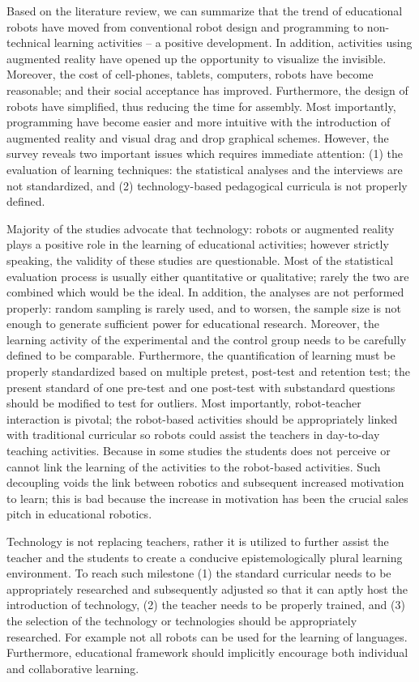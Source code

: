 \documentclass[conference]{IEEEtran}
\begin{document}
Based on the literature review, we can summarize that the trend of educational robots have moved from conventional 
robot design and programming to non-technical learning activities -- a positive development. In addition, activities 
using augmented reality have opened up the opportunity to visualize the invisible. Moreover, the cost of cell-phones, 
tablets, computers, robots have become reasonable; and their social acceptance has improved. Furthermore, the design of 
robots have simplified, thus reducing the time for assembly. Most importantly, programming have become easier and more 
intuitive with the introduction of augmented reality and visual drag and drop graphical schemes. However, the survey 
reveals two important issues which requires immediate attention: (1) the evaluation of learning techniques: the 
statistical analyses and the interviews are not standardized, and (2) technology-based pedagogical curricula is not 
properly defined.

Majority of the studies advocate that technology: robots or augmented reality plays a positive role in the learning 
of educational activities; however strictly speaking, the validity of these studies are questionable. Most of the 
statistical evaluation process is usually either quantitative or qualitative; rarely the two are combined which would 
be the ideal. In addition, the analyses are not performed properly: random sampling is rarely used, and to worsen, the 
sample size is not enough to generate sufficient power for educational research. Moreover, the learning activity of the 
experimental and the control group needs to be carefully defined to be comparable. Furthermore, the quantification of 
learning must be properly standardized based on multiple pretest, post-test and retention test; the present standard of 
one pre-test and one post-test with substandard questions should be modified to test for outliers. Most importantly, 
robot-teacher interaction is pivotal; the robot-based activities should be appropriately linked with traditional 
curricular so robots could assist the teachers in day-to-day teaching activities. Because in some studies the students 
does not perceive or cannot link the learning of the activities to the robot-based activities. Such decoupling voids the 
link between robotics and subsequent increased motivation to learn; this is bad because the increase in motivation has 
been the crucial sales pitch in educational robotics.

Technology is not replacing teachers, rather it is utilized to further assist the teacher and the students to create a 
conducive epistemologically plural learning environment. To reach such milestone (1) the standard curricular needs to 
be appropriately researched and subsequently adjusted so that it can aptly host the introduction of technology, (2) the 
teacher needs to be properly trained, and (3) the selection of the technology or technologies should be appropriately 
researched. For example not all robots can be used for the learning of languages. Furthermore, educational framework 
should implicitly encourage both individual and collaborative learning. 
\end{document}
